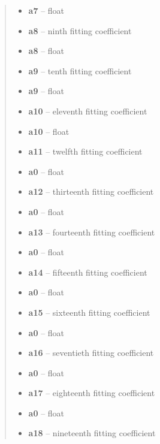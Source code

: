 \documentclass[a4paper,11pt,english]{sphinxmanual}
\begin{document}
\begin{fulllineitems}
\begin{quote}
\begin{description}
\begin{itemize}
\item {} 
\textbf{a7} -- float

\item {} 
\textbf{a8} -- ninth fitting coefficient

\item {} 
\textbf{a8} -- float

\item {} 
\textbf{a9} -- tenth fitting coefficient

\item {} 
\textbf{a9} -- float

\item {} 
\textbf{a10} -- eleventh fitting coefficient

\item {} 
\textbf{a10} -- float

\item {} 
\textbf{a11} -- twelfth fitting coefficient

\item {} 
\textbf{a0} -- float

\item {} 
\textbf{a12} -- thirteenth fitting coefficient

\item {} 
\textbf{a0} -- float

\item {} 
\textbf{a13} -- fourteenth fitting coefficient

\item {} 
\textbf{a0} -- float

\item {} 
\textbf{a14} -- fifteenth fitting coefficient

\item {} 
\textbf{a0} -- float

\item {} 
\textbf{a15} -- sixteenth fitting coefficient

\item {} 
\textbf{a0} -- float

\item {} 
\textbf{a16} -- seventieth fitting coefficient

\item {} 
\textbf{a0} -- float

\item {} 
\textbf{a17} -- eighteenth fitting coefficient

\item {} 
\textbf{a0} -- float

\item {} 
\textbf{a18} -- nineteenth fitting coefficient


\end{itemize}
\end{description}
\end{quote}
\end{fulllineitems}
\end{document}
